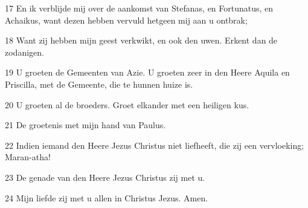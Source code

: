 \par 17 En ik verblijde mij over de aankomst van Stefanas, en Fortunatus, en Achaikus, want dezen hebben vervuld hetgeen mij aan u ontbrak;
\par 18 Want zij hebben mijn geest verkwikt, en ook den uwen. Erkent dan de zodanigen.
\par 19 U groeten de Gemeenten van Azie. U groeten zeer in den Heere Aquila en Priscilla, met de Gemeente, die te hunnen huize is.
\par 20 U groeten al de broeders. Groet elkander met een heiligen kus.
\par 21 De groetenis met mijn hand van Paulus.
\par 22 Indien iemand den Heere Jezus Christus niet liefheeft, die zij een vervloeking; Maran-atha!
\par 23 De genade van den Heere Jezus Christus zij met u.
\par 24 Mijn liefde zij met u allen in Christus Jezus. Amen.




